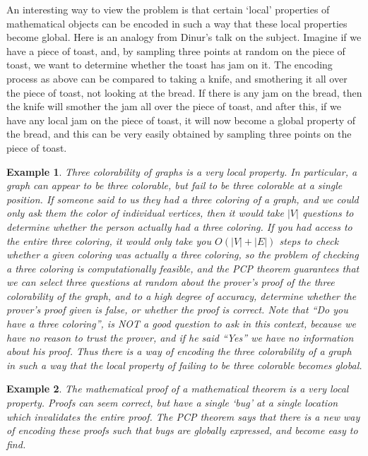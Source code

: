 \documentclass{article}
\theoremstyle{plain}
\newtheorem*{example}{Example}
\theoremstyle{definition}
\begin{document}
An interesting way to view the problem is that certain `local' properties of mathematical objects can be encoded in such a way that these local properties become global. Here is an analogy from Dinur's talk on the subject. Imagine if we have a piece of toast, and, by sampling three points at random on the piece of toast, we want to determine whether the toast has jam on it. The encoding process as above can be compared to taking a knife, and smothering it all over the piece of toast, not looking at the bread. If there is any jam on the bread, then the knife will smother the jam all over the piece of toast, and after this, if we have any local jam on the piece of toast, it will now become a global property of the bread, and this can be very easily obtained by sampling three points on the piece of toast.

\begin{example}
    Three colorability of graphs is a very local property. In particular, a graph can appear to be three colorable, but fail to be three colorable at a single position. If someone said to us they had a three coloring of a graph, and we could only ask them the color of individual vertices, then it would take $|V|$ questions to determine whether the person actually had a three coloring. If you had access to the entire three coloring, it would only take you $O(|V| + |E|)$ steps to check whether a given coloring was actually a three coloring, so the problem of checking a three coloring is computationally feasible, and the PCP theorem guarantees that we can select three questions at random about the prover's proof of the three colorability of the graph, and to a high degree of accuracy, determine whether the prover's proof given is false, or whether the proof is correct. Note that ``Do you have a three coloring'', is NOT a good question to ask in this context, because we have no reason to trust the prover, and if he said ``Yes'' we have no information about his proof. Thus there is a way of encoding the three colorability of a graph in such a way that the local property of failing to be three colorable becomes global.
\end{example}

\begin{example}
    The mathematical proof of a mathematical theorem is a {\it very} local property. Proofs can seem correct, but have a single `bug' at a single location which invalidates the entire proof. The PCP theorem says that there is a new way of encoding these proofs such that bugs are globally expressed, and become easy to find.
\end{example}
\end{document}
